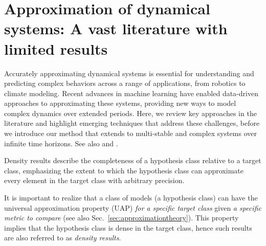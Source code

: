 \documentclass{article}
\theoremstyle{definition}
\theoremstyle{remark}
\newcounter{ct}
\begin{document}
\section{Approximation of dynamical systems: A vast literature with limited results}
Accurately approximating dynamical systems is essential for understanding and predicting complex behaviors across a range of applications, from robotics to climate modeling.
Recent advances in machine learning have enabled data-driven approaches to approximating these systems, providing new ways to model complex dynamics over extended periods.
Here, we review key approaches in the literature and highlight emerging techniques that address these challenges, before we introduce our method that extends to multi-stable and complex systems over infinite time horizons.
%
See also \citep{li2022approximation} and \citep{jiang2023brief}.

Density results describe the completeness of a hypothesis class relative to a target class, emphasizing the extent to which the hypothesis class can approximate every element in the target class with arbitrary precision.


It is important to realize that a class of models (a hypothesis class) can have the universal approximation property (UAP) \emph{for a specific target class} given \emph{a specific metric to compare} (see also Sec.~\ref{sec:approximationtheory}).
This property implies that the hypothesis class is dense in the target class, hence such results are also referred to as \emph{density results}.
\end{document}
